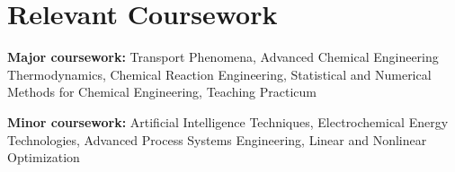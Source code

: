 \documentclass[letterpaper,11pt]{article}
\newcommand{\resumeSubHeadingListStart}{\begin{itemize}[leftmargin=0.15in, label={}]}
\newcommand{\resumeSubHeadingListEnd}{\end{itemize}}
\begin{document}

\section{Relevant Coursework}
\vspace{2pt}
\resumeSubHeadingListStart
  \small{\item{
      \textbf{Major coursework:}{ Transport Phenomena, Advanced Chemical Engineering Thermodynamics, Chemical Reaction Engineering, Statistical and Numerical Methods for Chemical Engineering, Teaching Practicum} \\ \vspace{3pt}
      
      \textbf{Minor coursework:}{ Artificial Intelligence Techniques, Electrochemical Energy Technologies, Advanced Process Systems Engineering, Linear and Nonlinear Optimization}
  }}
\resumeSubHeadingListEnd














\end{document}
